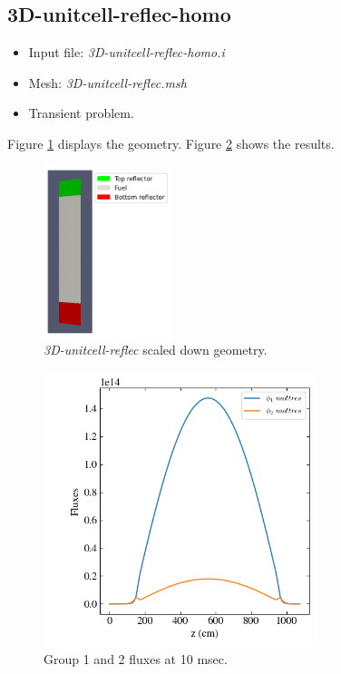\documentclass[11pt,letterpaper]{article}
\begin{document}
\subsection{3D-unitcell-reflec-homo}

	\begin{itemize}
		\item Input file: \textit{3D-unitcell-reflec-homo.i}
		\item Mesh: \textit{3D-unitcell-reflec.msh}
		\item Transient problem.
	\end{itemize}

Figure \ref{fig:3D-unitcell-reflec-homo} displays the geometry.
Figure \ref{fig:3D-unitcell-reflec-homo1} shows the results.

	\begin{figure}[htbp!]
		\centering
		\includegraphics[height=5cm]{3D-unitcell-reflec-homo-meshB}
		\caption{\textit{3D-unitcell-reflec} scaled down geometry.}
		\label{fig:3D-unitcell-reflec-homo}
	\end{figure}

	\begin{figure}[htbp!]
		\centering
		\includegraphics[height=8cm]{3D-unitcell-reflec-homo}
		\caption{Group 1 and 2 fluxes at 10 msec.}
		\label{fig:3D-unitcell-reflec-homo1}
	\end{figure}
\end{document}
